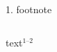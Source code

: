 \documentclass[hyperref={hyperfootnotes=false}]{beamer}
\begin{document}
\begin{frame}{1. footnote}
  \begin{columns}
    \begin{column}{0.5\textwidth}
      text$^{\text{1--2}}$
    \end{column}
  \end{columns}
\end{frame}
\end{document}

